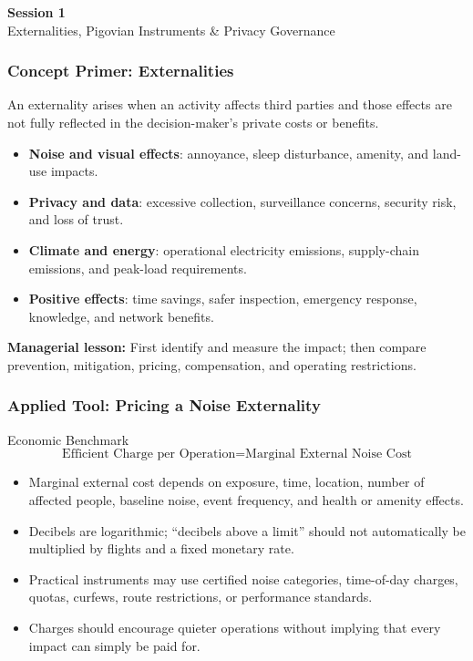 \documentclass{beamer}
\begin{document}
\begin{frame}[c]
  \begin{center}
    \huge\color{cuhkpurple}\textbf{Session 1}\\
    \vspace{0.5cm}
    \Large Externalities, Pigovian Instruments \& Privacy Governance
  \end{center}
\end{frame}

\begin{frame}[t]
\frametitle{Concept Primer: Externalities}
An externality arises when an activity affects third parties and those effects are not fully reflected in the decision-maker's private costs or benefits.
\begin{itemize}
\item \textbf{Noise and visual effects}: annoyance, sleep disturbance, amenity, and land-use impacts.
\item \textbf{Privacy and data}: excessive collection, surveillance concerns, security risk, and loss of trust.
\item \textbf{Climate and energy}: operational electricity emissions, supply-chain emissions, and peak-load requirements.
\item \textbf{Positive effects}: time savings, safer inspection, emergency response, knowledge, and network benefits.
\end{itemize}
\textbf{Managerial lesson:} First identify and measure the impact; then compare prevention, mitigation, pricing, compensation, and operating restrictions.
\end{frame}

\begin{frame}[t]
\frametitle{Applied Tool: Pricing a Noise Externality}
\begin{block}{Economic Benchmark}
\[
\text{Efficient Charge per Operation}
=\text{Marginal External Noise Cost}
\]
\end{block}
\begin{itemize}
\item Marginal external cost depends on exposure, time, location, number of affected people, baseline noise, event frequency, and health or amenity effects.
\item Decibels are logarithmic; ``decibels above a limit'' should not automatically be multiplied by flights and a fixed monetary rate.
\item Practical instruments may use certified noise categories, time-of-day charges, quotas, curfews, route restrictions, or performance standards.
\item Charges should encourage quieter operations without implying that every impact can simply be paid for.
\end{itemize}
\end{frame}
\end{document}

